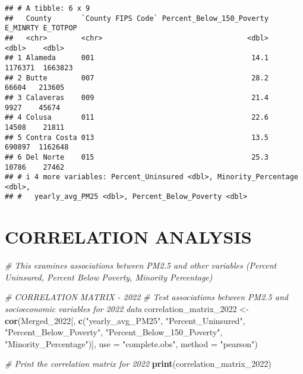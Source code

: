 \documentclass[
]{article}
\newenvironment{Shaded}{\begin{snugshade}}{\end{snugshade}}
\newcommand{\AttributeTok}[1]{\textcolor[rgb]{0.13,0.29,0.53}{#1}}
\newcommand{\CommentTok}[1]{\textcolor[rgb]{0.56,0.35,0.01}{\textit{#1}}}
\newcommand{\FunctionTok}[1]{\textcolor[rgb]{0.13,0.29,0.53}{\textbf{#1}}}
\newcommand{\NormalTok}[1]{#1}
\newcommand{\OtherTok}[1]{\textcolor[rgb]{0.56,0.35,0.01}{#1}}
\newcommand{\StringTok}[1]{\textcolor[rgb]{0.31,0.60,0.02}{#1}}
\begin{document}
\begin{verbatim}
## # A tibble: 6 x 9
##   County       `County FIPS Code` Percent_Below_150_Poverty E_MINRTY E_TOTPOP
##   <chr>        <chr>                                  <dbl>    <dbl>    <dbl>
## 1 Alameda      001                                     14.1  1176371  1663823
## 2 Butte        007                                     28.2    66604   213605
## 3 Calaveras    009                                     21.4     9927    45674
## 4 Colusa       011                                     22.6    14508    21811
## 5 Contra Costa 013                                     13.5   690897  1162648
## 6 Del Norte    015                                     25.3    10786    27462
## # i 4 more variables: Percent_Uninsured <dbl>, Minority_Percentage <dbl>,
## #   yearly_avg_PM25 <dbl>, Percent_Below_Poverty <dbl>
\end{verbatim}

\section{CORRELATION ANALYSIS}\label{correlation-analysis}

\begin{Shaded}
\begin{Highlighting}[]
\CommentTok{\# This examines associations between PM2.5 and other variables (Percent Uninsured, Percent Below Poverty, Minority Percentage)}

\CommentTok{\# CORRELATION MATRIX {-} 2022}
\CommentTok{\# Test associations between PM2.5 and socioeconomic variables for 2022 data}
\NormalTok{correlation\_matrix\_2022 }\OtherTok{\textless{}{-}} \FunctionTok{cor}\NormalTok{(Merged\_2022[, }\FunctionTok{c}\NormalTok{(}\StringTok{"yearly\_avg\_PM25"}\NormalTok{, }
                                               \StringTok{"Percent\_Uninsured"}\NormalTok{, }
                                               \StringTok{"Percent\_Below\_Poverty"}\NormalTok{, }
                                               \StringTok{"Percent\_Below\_150\_Poverty"}\NormalTok{, }
                                               \StringTok{"Minority\_Percentage"}\NormalTok{)], }
                               \AttributeTok{use =} \StringTok{"complete.obs"}\NormalTok{, }\AttributeTok{method =} \StringTok{"pearson"}\NormalTok{)}

\CommentTok{\# Print the correlation matrix for 2022}
\FunctionTok{print}\NormalTok{(correlation\_matrix\_2022)}
\end{Highlighting}
\end{Shaded}
\end{document}
